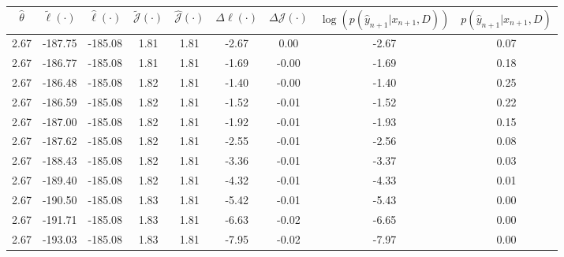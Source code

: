 \begin{table}[htbp]
        \centering
        \tiny
        \begin{adjustbox}{angle=90}
            \begin{tabular}{|c|c|c|c|c|c|c|c|c|}
                \hline
                 $\hat{\theta}$ & $\tilde{\ell}(\cdot)$ & $\hat{\ell}(\cdot)$ & $\tilde{\mathcal{J}}(\cdot)$ & $\hat{\mathcal{J}}(\cdot)$ & $\Delta \ell(\cdot)$ & $\Delta \mathcal{J}(\cdot)$ & $\log(p(\hat{y}_{n+1}|x_{n+1}, D))$ & $p(\hat{y}_{n+1}|x_{n+1}, D)$ \\
                \hline
                 2.67 & -187.75 & -185.08 & 1.81 & 1.81 & -2.67 & 0.00 & -2.67 & 0.07\\ \hline
 2.67 & -186.77 & -185.08 & 1.81 & 1.81 & -1.69 & -0.00 & -1.69 & 0.18\\ \hline
 2.67 & -186.48 & -185.08 & 1.82 & 1.81 & -1.40 & -0.00 & -1.40 & 0.25\\ \hline
 2.67 & -186.59 & -185.08 & 1.82 & 1.81 & -1.52 & -0.01 & -1.52 & 0.22\\ \hline
 2.67 & -187.00 & -185.08 & 1.82 & 1.81 & -1.92 & -0.01 & -1.93 & 0.15\\ \hline
 2.67 & -187.62 & -185.08 & 1.82 & 1.81 & -2.55 & -0.01 & -2.56 & 0.08\\ \hline
 2.67 & -188.43 & -185.08 & 1.82 & 1.81 & -3.36 & -0.01 & -3.37 & 0.03\\ \hline
 2.67 & -189.40 & -185.08 & 1.82 & 1.81 & -4.32 & -0.01 & -4.33 & 0.01\\ \hline
 2.67 & -190.50 & -185.08 & 1.83 & 1.81 & -5.42 & -0.01 & -5.43 & 0.00\\ \hline
 2.67 & -191.71 & -185.08 & 1.83 & 1.81 & -6.63 & -0.02 & -6.65 & 0.00\\ \hline
 2.67 & -193.03 & -185.08 & 1.83 & 1.81 & -7.95 & -0.02 & -7.97 & 0.00\\ \hline
            \end{tabular}
        \end{adjustbox}
        \caption{}
        \label{}
    \end{table}
    